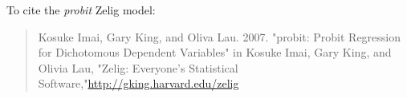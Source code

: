 To cite the \emph{ probit } Zelig model:
 \begin{verse}
 Kosuke Imai, Gary King, and Oliva Lau. 2007. "probit: Probit Regression for Dichotomous Dependent Variables" in Kosuke Imai, Gary King, and Olivia Lau, "Zelig: Everyone's Statistical Software,"\url{http://gking.harvard.edu/zelig} 
\end{verse}